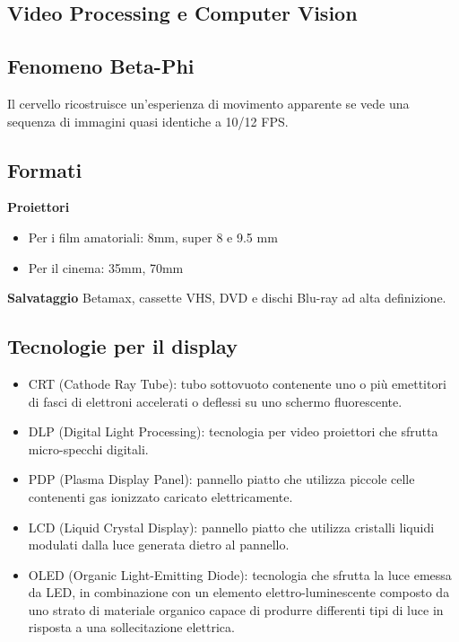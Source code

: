 \documentclass[8pt,a4paper]{article}
\begin{document}
\begin{multicols}{5}
    \section{Video Processing e Computer Vision}
    \subsection{Fenomeno Beta-Phi}
    Il cervello ricostruisce un'esperienza di movimento apparente se vede una 
    sequenza di immagini quasi identiche a 10/12 FPS.
    \subsection{Formati}
      \textbf{Proiettori}
      \begin{itemize}
        \item Per i film amatoriali: 8mm, super 8 e 9.5 mm
        \item Per il cinema: 35mm, 70mm
      \end{itemize}
      \textbf{Salvataggio}
      Betamax, cassette VHS, DVD e dischi Blu-ray ad alta definizione.
    \subsection{Tecnologie per il display}
    \begin{itemize}
      \item CRT (Cathode Ray Tube): tubo sottovuoto contenente uno o più emettitori 
      di fasci di elettroni accelerati o deflessi su uno schermo fluorescente.
      \item DLP (Digital Light Processing): tecnologia per video proiettori che 
      sfrutta micro-specchi digitali.
      \item PDP (Plasma Display Panel): pannello piatto che utilizza piccole celle 
      contenenti gas ionizzato caricato elettricamente.
      \item LCD (Liquid Crystal Display): pannello piatto che utilizza cristalli liquidi 
      modulati dalla luce generata dietro al pannello. 
      \item OLED (Organic Light-Emitting Diode): tecnologia che sfrutta la luce emessa 
      da LED, in combinazione con un elemento elettro-luminescente composto da uno 
      strato di materiale organico capace di produrre differenti tipi di luce in 
      risposta a una sollecitazione elettrica.
    \end{itemize}

\end{multicols}
\end{document}

